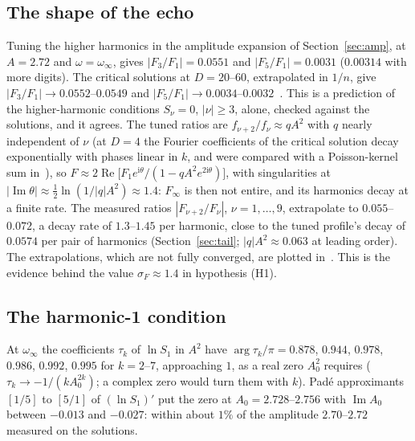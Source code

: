 \documentclass{amsart}
\numberwithin{equation}{section}
\theoremstyle{plain}
\theoremstyle{definition}
\theoremstyle{remark}
\newcommand{\winf}{\omega_\infty}
\newcommand{\re}{\operatorname{Re}}
\newcommand{\im}{\operatorname{Im}}
\newcommand{\iu}{\mathrm{i}}
\begin{document}
\subsection{The shape of the echo}
Tuning the higher harmonics in the amplitude expansion of Section~\ref{sec:amp}, at $A = 2.72$ and $\omega = \winf$, gives
$|F_3/F_1| = 0.0551$ and $|F_5/F_1| = 0.0031$ ($0.00314$ with more digits). The critical solutions at $D = 20$--$60$, extrapolated in
$1/n$, give $|F_3/F_1| \to 0.0552$--$0.0549$ and $|F_5/F_1| \to 0.0034$--$0.0032$~\cite{companion}. This is a prediction of the
higher-harmonic conditions $S_\nu = 0$, $|\nu| \ge 3$, alone, checked against the solutions, and it agrees. The tuned ratios are
$f_{\nu+2}/f_\nu \approx qA^2$ with $q$ nearly independent of $\nu$ (at $D = 4$ the Fourier coefficients of the critical solution decay exponentially with phases
linear in $k$, and were compared with a Poisson-kernel sum in~\cite[Sec.~IV.2, Eq.~(59)]{MartinGarciaGundlach2003}), so $F \approx 2\re\big[F_1e^{\iu\theta}/(1 - qA^2e^{2\iu\theta})\big]$, with
singularities at $|\im\theta| \approx \tfrac12\ln(1/|q|A^2) \approx 1.4$: $F_\infty$ is then not entire, and its harmonics decay at a
finite rate. The measured ratios $|F_{\nu+2}/F_\nu|$, $\nu = 1, \dots, 9$, extrapolate to $0.055$--$0.072$, a decay rate of $1.3$--$1.45$ per
harmonic, close to the tuned profile's decay of $0.0574$ per pair of harmonics (Section~\ref{sec:tail}; $|q|A^2 \approx 0.063$ at
leading order). The extrapolations, which are not fully converged, are plotted in~\cite{companion}. This is the evidence
behind the value $\sigma_F \approx 1.4$ in hypothesis (H1).

\subsection{The harmonic-1 condition}
At $\winf$ the coefficients $\tau_k$ of $\ln S_1$ in $A^2$ have $\arg\tau_k/\pi = 0.878$, $0.944$, $0.978$, $0.986$, $0.992$, $0.995$ for
$k = 2$--$7$, approaching $1$, as a real zero $A_0^2$ requires ($\tau_k \to -1/(kA_0^{2k})$; a complex zero would turn them with $k$).
Pad\'e approximants $[1/5]$ to $[5/1]$ of $(\ln S_1)'$ put the zero at $A_0 = 2.728$--$2.756$ with $\im A_0$ between $-0.013$ and $-0.027$:
within about $1\%$ of the amplitude $2.70$--$2.72$ measured on the solutions.
\end{document}
